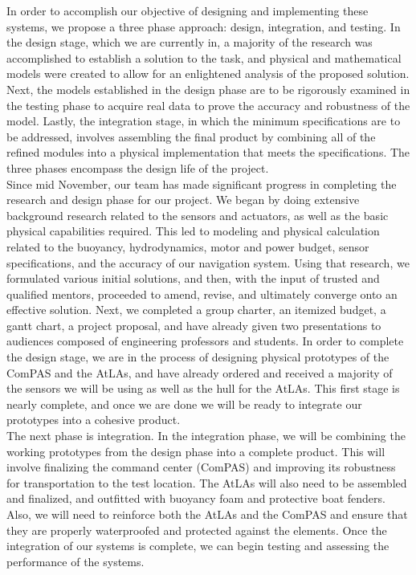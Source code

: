 \documentclass[11pt]{article}
\begin{document}
In order to accomplish our objective of designing and implementing these systems, we propose a three phase approach: design, integration, and testing. In the design stage, which we are currently in, a majority of the research was accomplished to establish a solution to the task, and physical and mathematical models were created to allow for an enlightened analysis of the proposed solution. Next, the models established in the design phase are to be rigorously examined in the testing phase to acquire real data to prove the accuracy and robustness of the model. Lastly, the integration stage, in which the minimum specifications are to be addressed, involves assembling the final product by combining all of the refined modules into a physical implementation that meets the specifications. The three phases encompass the design life of the project. \\

Since mid November, our team has made significant progress in completing the research and design phase for our project. We began by doing extensive background research related to the sensors and actuators, as well as the basic physical capabilities  required. This led to modeling and physical calculation related to the buoyancy, hydrodynamics, motor and power budget, sensor specifications, and the accuracy of our navigation system. Using that research, we formulated various initial solutions, and then, with the input of trusted and qualified mentors, proceeded to amend, revise, and ultimately converge onto an effective solution. Next, we completed a group charter, an itemized budget, a gantt chart, a project proposal, and have already given two presentations to audiences composed of engineering professors and students. In order to complete the design stage, we are in the process of designing physical prototypes of the ComPAS and the AtLAs, and have already ordered and received a majority of the sensors we will be using as well as the hull for the AtLAs. This first stage is nearly complete, and once we are done we will be ready to integrate our prototypes into a cohesive product.\\

The next phase is integration. In the integration phase, we will be combining the working prototypes from the design phase into a complete product. This will involve finalizing the command center (ComPAS) and improving its robustness for transportation to the test location. The AtLAs will also need to be assembled and finalized, and outfitted with buoyancy foam and protective boat fenders. Also, we will need to reinforce both the AtLAs and the ComPAS and ensure that they are properly waterproofed and protected against the elements. Once the integration of our systems is complete, we can begin testing and assessing the performance of the systems.\\
\end{document}
